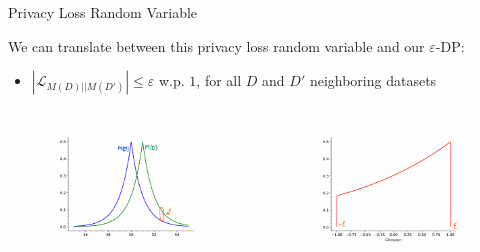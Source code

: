 \documentclass[12pt,aspectratio=169]{beamer}
\begin{document}
\begin{frame}{Privacy Loss Random Variable}

We can translate between this privacy loss random variable and our $\varepsilon$-DP:
\begin{itemize}
    \item[] $|\mathcal{L}_{M(D) || M(D')}| \leq \varepsilon$ w.p. $1$, for all $D$ and $D'$ neighboring datasets
\end{itemize}

\begin{columns}[T]

\begin{column}{.5\textwidth}

\begin{figure}
    \centering
    \includegraphics[width=1.1\linewidth]{figures/mech_plot_annotated_flattened.pdf}
\end{figure}

\end{column}

\begin{column}{.5\textwidth}

\begin{figure}
    \centering
    \includegraphics[width=1.1\linewidth]{figures/priv_loss_plot_annotated_flattened.pdf}
\end{figure}


\end{column}
\end{columns}
\end{frame}
\end{document}
